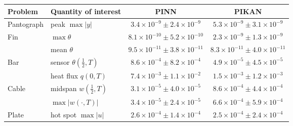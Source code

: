 \begin{tabular}{llcc}
\toprule
Problem & Quantity of interest & PINN & PIKAN\\
\midrule
Pantograph & peak $\max|y|$ & $3.4{\times}10^{-9}\pm2.4{\times}10^{-9}$ & $5.3{\times}10^{-9}\pm3.1{\times}10^{-9}$\\
Fin & $\max\theta$ & $8.1{\times}10^{-10}\pm5.2{\times}10^{-10}$ & $2.3{\times}10^{-9}\pm1.3{\times}10^{-9}$\\
 & mean $\theta$ & $9.5{\times}10^{-11}\pm3.8{\times}10^{-11}$ & $8.3{\times}10^{-11}\pm4.0{\times}10^{-11}$\\
Bar & sensor $\theta(\tfrac12,T)$ & $8.6{\times}10^{-4}\pm8.2{\times}10^{-4}$ & $4.9{\times}10^{-5}\pm4.5{\times}10^{-5}$\\
 & heat flux $q(0,T)$ & $7.4{\times}10^{-3}\pm1.1{\times}10^{-2}$ & $1.5{\times}10^{-3}\pm1.2{\times}10^{-3}$\\
Cable & midspan $w(\tfrac12,T)$ & $3.1{\times}10^{-5}\pm4.0{\times}10^{-5}$ & $8.6{\times}10^{-4}\pm4.4{\times}10^{-4}$\\
 & $\max|w(\cdot,T)|$ & $3.4{\times}10^{-5}\pm2.4{\times}10^{-5}$ & $6.6{\times}10^{-4}\pm5.9{\times}10^{-4}$\\
Plate & hot spot $\max|u|$ & $2.6{\times}10^{-4}\pm1.4{\times}10^{-4}$ & $2.5{\times}10^{-4}\pm2.4{\times}10^{-4}$\\
\bottomrule
\end{tabular}